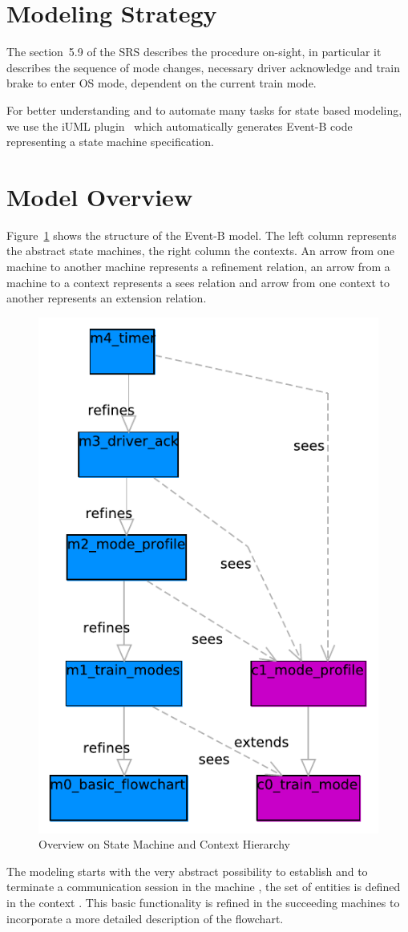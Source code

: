 \documentclass{template/openetcs_article}
\begin{document}
\section{Modeling Strategy}
\label{sec:modeling-strategy}

The section~5.9 of the SRS describes the procedure on-sight, in particular it
describes the sequence of mode changes, necessary driver acknowledge and train
brake to enter OS mode, dependent on the current train mode.

For better understanding and to automate many tasks for state based modeling, we
use the iUML plugin~\cite{UML-plugin} which automatically generates Event-B code
representing a state machine specification.

\section{Model Overview}
\label{sec:model-overview}

Figure~\ref{fig:model-overview} shows the structure of the Event-B model. The
left column represents the abstract state machines, the right column the
contexts. An arrow from one machine to another machine represents a refinement
relation, an arrow from a machine to a context represents a sees relation and
arrow from one context to another represents an extension relation.

\begin{figure}[ht]
  \centering
  \includegraphics[width=.3\textwidth]{SubSet_026_5_9}
  \caption{Overview on State Machine and Context Hierarchy}
  \label{fig:model-overview}
\end{figure}

The modeling starts with the very abstract possibility to establish and to
terminate a communication session in the machine , the set of
entities is defined in the context . This basic functionality is
refined in the succeeding machines to incorporate a more detailed description of
the flowchart.
\end{document}

